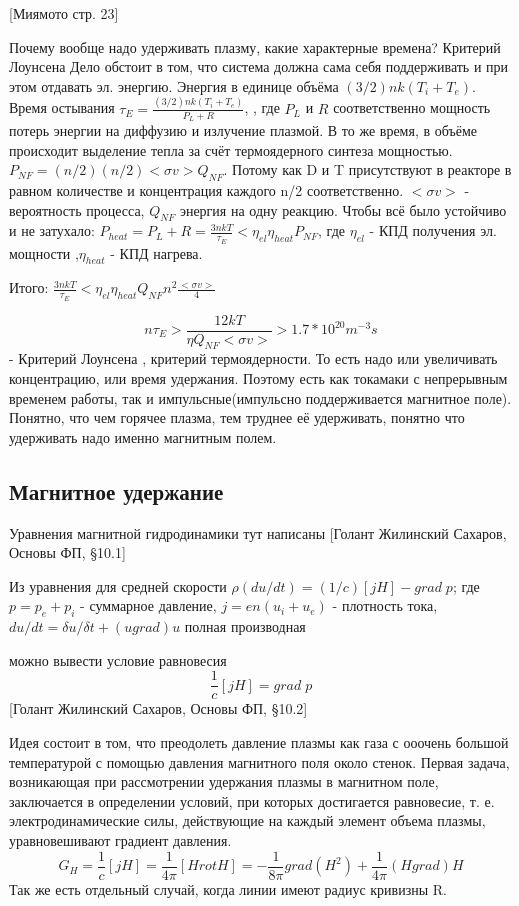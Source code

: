 \documentclass[10pt, a4paper]{article}
\begin{document}
[Миямото стр. 23]

Почему вообще надо удерживать плазму, какие характерные времена? Критерий Лоунсена 
Дело обстоит в том, что система должна сама себя поддерживать и при этом отдавать эл. энергию. Энергия в единице объёма $(3/2)nk(T_i+T_e)$. Время остывания $\tau_E = \frac { (3/2)nk(T_i+T_e) }{P_L+R}$, , где $P_L$ и $R$ соответственно мощность потерь энергии на диффузию и излучение плазмой. В то же время, в объёме происходит выделение тепла за счёт термоядерного синтеза мощностью. $P_{NF}=(n/2)(n/2)<\sigma v> Q_{NF} $. Потому
 как D и T присутствуют в реакторе в равном количестве и концентрация каждого n/2 соответственно. $<\sigma v> $ - вероятность процесса,   $Q_{NF} $ энергия на одну реакцию.
Чтобы всё было устойчиво и не затухало: $P_{heat}=P_L + R = \frac{3nkT}{\tau_E} < \eta_{el} \eta_{heat} P_{NF} $, где $\eta_{el} $ - КПД получения эл. мощности ,$ \eta_{heat} $ - КПД нагрева.

Итого: $ \frac{3nkT}{\tau_E} < \eta_{el} \eta_{heat} Q_{NF} n^{2} \frac{<\sigma v>}{4}$

\begin{equation}
	n \tau_E > \frac{12 kT}{\eta Q_{NF} <\sigma v>} > 1.7*10^{20} m^{-3} s
\end{equation}
 - Критерий Лоунсена , критерий термоядерности. То есть надо или увеличивать концентрацию, или время удержания. Поэтому есть как токамаки с непрерывным временем работы, так и импульсные(импульсно поддерживается магнитное поле).
Понятно, что чем горячее плазма, тем труднее её удерживать, понятно что удерживать надо именно магнитным полем.

\subsection{Магнитное удержание}

Уравнения магнитной гидродинамики тут написаны [Голант Жилинский Сахаров, Основы ФП,  §10.1]

Из уравнения для средней скорости $\rho (du/dt)=(1/c)[j H]-grad\;p$; где $p=p_e+p_i$ - суммарное давление, $j=en(u_i+u_e)$ - плотность тока, $ du/dt=\delta u / \delta t + (u grad)u$ полная производная

можно вывести условие равновесия
\begin{equation}
	\frac{1}{c}[j H]=grad\;p
\end{equation}
[Голант Жилинский Сахаров, Основы ФП,  §10.2]


Идея состоит в том, что преодолеть давление плазмы как газа с ооочень большой температурой с помощью давления магнитного поля около стенок.
Первая задача, возникающая при рассмотрении удержания плазмы в магнитном поле, заключается в определении условий, при которых достигается равновесие, т. е. электродинамические силы, действующие на каждый элемент объема плазмы, уравновешивают градиент давления.
\begin{equation}
	G_H=\frac{1}{c} [j H]=\frac{1}{4 \pi} [H rotH]=-\frac{1}{8 \pi} grad(H^{2})+\frac{1}{4 \pi} (H grad) H
\end{equation}
Так же есть отдельный случай, когда линии имеют радиус кривизны R.
\end{document}
